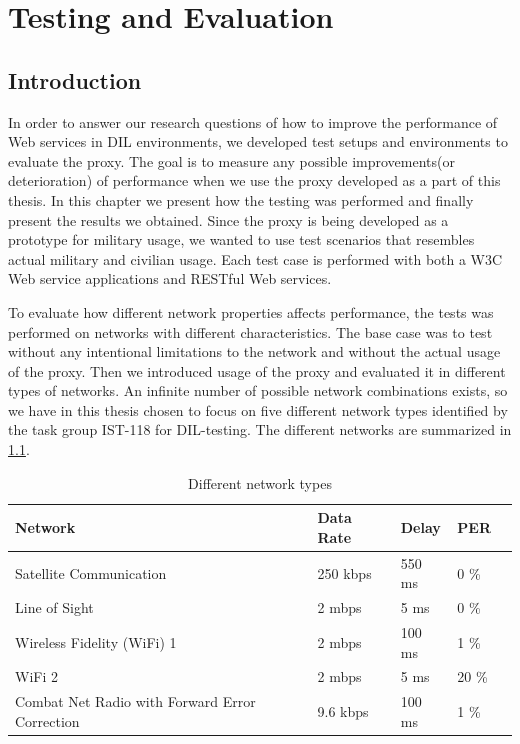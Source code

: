 \chapter{Testing and Evaluation}



\section{Introduction}

In order to answer our research questions of how to improve the performance of
Web services in DIL environments, we developed test setups and environments to
evaluate the proxy. The goal is to measure any possible improvements(or
deterioration) of performance when we use the proxy developed as a part of
this thesis. In this chapter we present how the testing was performed and
finally present the results we obtained. Since the proxy is being developed as
a prototype for military usage, we wanted to use test scenarios that resembles
actual military and civilian usage. Each test case is performed with both a
W3C Web service applications and RESTful Web services.

To evaluate how different network properties affects performance, the tests
was performed on networks with different characteristics. The base case was to
test without any intentional limitations to the network and without the actual
usage of the proxy. Then we introduced usage of the proxy and evaluated it in
different types of networks. An infinite number of possible network
combinations exists, so we have in this thesis chosen to focus on five
different network types identified by the task group IST-118 for DIL-testing.
The different networks are summarized in \cref{table-network-types}.


\begin{table}[h]
\begin{tabular}{| l | l | l | l | l |}
\hline
  \textbf{Network} & \textbf{Data Rate} & \textbf{Delay} & \textbf{PER} \\ \hline
  Satellite Communication & 250 kbps & 550 ms & 0 \% \\ \hline
  Line of Sight & 2 mbps & 5 ms & 0 \% \\ \hline
  Wireless Fidelity (WiFi) 1 & 2 mbps & 100 ms & 1 \% \\ \hline
  WiFi 2 & 2 mbps & 5 ms & 20 \% \\ \hline
  Combat Net Radio with Forward Error Correction & 9.6 kbps & 100 ms & 1 \% \\ \hline

\end{tabular}
\caption{Different network types}
\label{table-network-types}
\end{table}


